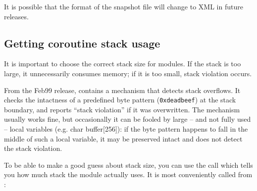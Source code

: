 It is possible that the format of the snapshot file will change to XML
in future {\opp} releases.


%
%
%
%





\subsection{Getting coroutine stack usage}

It is important to choose the correct stack size for
modules.  If the stack is
too large, it unnecessarily consumes memory; if it is too small, stack
violation occurs.

From the Feb99 release, {\opp} contains a mechanism that detects stack
overflows. It checks the intactness of a
predefined byte pattern (\texttt{0xdeadbeef}) at the stack boundary,
and reports ``stack violation'' if it was
overwritten. The mechanism usually works fine, but occasionally it can
be fooled by large -- and not fully used -- local variables (e.g. char
buffer[256]): if the byte pattern happens to fall in the middle of
such a local variable, it may be preserved intact and {\opp} does not
detect the stack violation.

To be able to make a good guess about stack size, you can use
the  call which tells you how much stack the module
actually uses. It is most conveniently called from :

